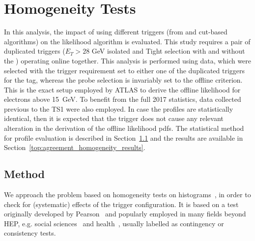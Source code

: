 \FloatBarrier
\section[Homogeneity Tests]{Homogeneity Tests}\label{ssec:agreement}

In this 
analysis, the impact of using different triggers (from \rnn{} and cut-based algorithms) on the likelihood algorithm is evaluated. This 
study requires a pair of duplicated triggers ($E_T > 28$ GeV isolated and Tight selection with and without the \rnn{}) operating online together. 
This analysis is performed using \Zee{} \tnp{} data, which were selected with the trigger requirement set to either one of the duplicated triggers for the tag, whereas the probe selection is invariably set to the offline \vloose{} criterion. This is the exact setup employed by ATLAS to derive the offline likelihood for electrons above \SI{15}{\GeV}. To benefit from the full 2017 statistics, data collected previous to the TS1 were also employed. In case the profiles are statistically identical, then it is expected that the \rnn{} trigger does not cause any relevant alteration in the derivation of the offline likelihood pdfs.  The statistical method for profile evaluation is described in Section~\ref{top:homogeneity_method} and the results are available in Section~\ref{top:agreement_homogeneity_results}.




\subsection{Method}\label{top:homogeneity_method}



We approach the problem based on homogeneity tests on histograms~\cite{homogeneity_test}, in order to check for (systematic) effects of the trigger configuration. It is based on a test originally developed by Pearson~\cite{pearson1911probability} and popularly employed in many fields beyond HEP, e.g. social sciences~\cite{wickens2014multiway} and health~\cite{ma2015homogeneity}, usually labelled as contingency or consistency tests.

